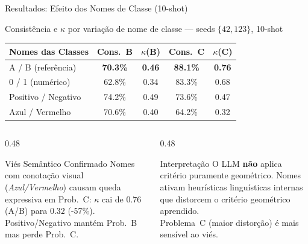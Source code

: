 \documentclass[aspectratio=169, 8pt]{beamer}
\begin{document}
\begin{frame}{Resultados: Efeito dos Nomes de Classe (10-shot)}
  \begin{block}{Consistência e $\kappa$ por variação de nome de classe --- seeds
    $\{42,123\}$, 10-shot}
  \end{block}

  \vspace{0.3em}

  \begin{center}
  \renewcommand{\arraystretch}{1.35}
  \begin{tabular}{lcccc}
    \toprule
    \textbf{Nomes das Classes} & \textbf{Cons.~B} & \textbf{$\kappa$(B)}
      & \textbf{Cons.~C} & \textbf{$\kappa$(C)} \\
    \midrule
    A / B (referência)       & \textbf{70.3\%} & \textbf{0.46}
                             & \textbf{88.1\%} & \textbf{0.76} \\
    0 / 1 (numérico)         & 62.8\% & 0.34 & 83.3\% & 0.68 \\
    Positivo / Negativo      & 74.2\% & 0.49
                             & \cellcolor{myred!15}73.6\% & \cellcolor{myred!15}0.47 \\
    Azul / Vermelho          & 70.6\% & 0.40
                             & \cellcolor{myred!25}64.2\% & \cellcolor{myred!25}0.32 \\
    \bottomrule
  \end{tabular}
  \end{center}

  \vspace{0.4em}

  \begin{columns}[T]
    \begin{column}{0.48\textwidth}
      \begin{alertblock}{Viés Semântico Confirmado}
        \footnotesize
        Nomes com conotação visual (\emph{Azul/Vermelho}) causam
        queda expressiva em Prob.~C: $\kappa$ cai de $0.76$
        (A/B) para $0.32$ (-57\%).\\
        Positivo/Negativo mantém Prob.~B mas perde Prob.~C.
      \end{alertblock}
    \end{column}
    \begin{column}{0.48\textwidth}
      \begin{exampleblock}{Interpretação}
        \footnotesize
        O LLM \textbf{não} aplica critério puramente geométrico.
        Nomes ativam heurísticas linguísticas internas que
        distorcem o critério geométrico aprendido.\\
        Problema~C (maior distorção) é mais sensível ao viés.
      \end{exampleblock}
    \end{column}
  \end{columns}
\end{frame}
\end{document}
